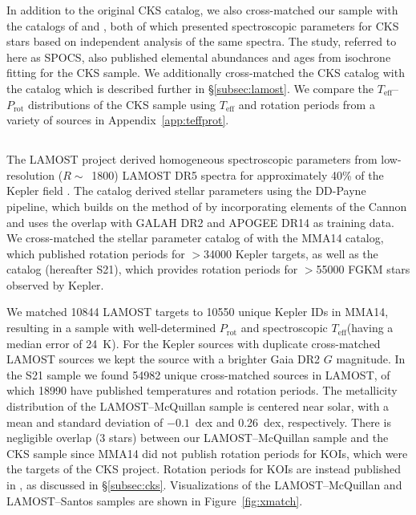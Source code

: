 \documentclass[trackchanges,twocolumn]{aastex631}
\newcommand{\lamostmcq}{LAMOST--McQuillan\xspace}
\newcommand{\lamostsan}{LAMOST--Santos\xspace}
\newcommand{\mma}{MMA14\xspace}
\newcommand{\santos}{S21\xspace}
\newcommand{\teff}{\ensuremath{T_{\mathrm{eff}}}\xspace}
\newcommand{\prot}{\ensuremath{P_\mathrm{rot}}\xspace}
\begin{document}
In addition to the original CKS catalog, we also cross-matched our sample with the catalogs of \citet{Brewer2018} and \citet{Martinez2019}, both of which presented spectroscopic parameters for CKS stars based on independent analysis of the same spectra. The \citet{Brewer2018} study, referred to here as SPOCS, also published elemental abundances and ages from isochrone fitting for the CKS sample. We additionally cross-matched the CKS catalog with the  catalog \citep{Xiang2019} which is described further in \S\ref{subsec:lamost}. We compare the \teff--\prot distributions of the CKS sample using \teff and rotation periods from a variety of sources in Appendix~\ref{app:teffprot}.

\subsection{ \label{subsec:lamost}}
The LAMOST project derived homogeneous spectroscopic parameters from low-resolution ($R\sim$~1800) LAMOST DR5 spectra for approximately 40\% of the Kepler field \citep{Zong2018, Xiang2019}.  The \citet{Xiang2019} catalog derived stellar parameters using the DD-Payne pipeline, which builds on the method of \citet{Ting2017b} by incorporating elements of the Cannon \citep{Ness2015} and uses the overlap with GALAH DR2 and APOGEE DR14 as training data. We cross-matched the  stellar parameter catalog of \citet{Xiang2019} with the \mma catalog, which published rotation periods for $>$34000 Kepler targets, as well as the \citet{Santos2021} catalog (hereafter S21), which provides rotation periods for $>$55000 FGKM stars observed by Kepler.

We matched 10844 LAMOST targets to 10550 unique Kepler IDs in \mma, resulting in a sample with well-determined \prot and spectroscopic \teff (having a median error of 24~K). For the Kepler sources with duplicate cross-matched LAMOST sources we kept the source with a brighter Gaia DR2 $G$ magnitude. In the \santos sample we found 54982 unique cross-matched sources in LAMOST, of which 18990 have published temperatures and rotation periods. The metallicity distribution of the LAMOST--McQuillan sample is centered near solar, with a mean and standard deviation of $-0.1$~dex and 0.26~dex, respectively. There is negligible overlap (3 stars) between our LAMOST--McQuillan sample and the CKS sample since \mma did not publish rotation periods for KOIs, which were the targets of the CKS project. Rotation periods for KOIs are instead published in \citet{McQuillan2013}, as discussed in \S\ref{subsec:cks}. Visualizations of the \lamostmcq and \lamostsan samples are shown in Figure~\ref{fig:xmatch}.
\end{document}
